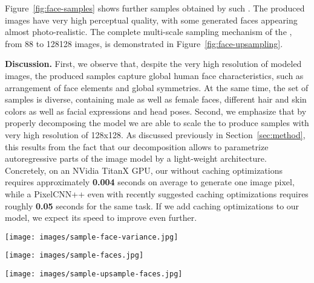 Figure~\ref{fig:face-samples} shows further samples obtained by such 
\emph{\SAMPLING}. 
The produced images have very high perceptual quality, with some generated 
faces appearing almost photo-realistic.
The complete multi-scale sampling mechanism of the \PYRAMID, from 
88 to 128128 images, is demonstrated in Figure~\ref{fig:face-upsampling}. 

\textbf{Discussion.} First, we observe that, despite the very high 
resolution of modeled images, the produced samples capture global human 
face characteristics, such as arrangement of face elements and global 
symmetries. At the same time, the set of samples is diverse, containing 
male as well as female faces, different hair and skin colors as well 
as facial expressions and head poses. 
Second, we emphasize that by properly decomposing the model we are 
able to scale the \PYRAMID to produce samples with very high 
resolution of 128x128.
As discussed previously in Section~\ref{sec:method}, this results from 
the fact that our decomposition allows to parametrize autoregressive 
parts of the image model by a light-weight architecture.
Concretely, on an NVidia TitanX GPU, our \PYRAMID without 
caching optimizations requires approximately \textbf{0.004} seconds 
on average to generate one image pixel, while a PixelCNN++ even with 
recently suggested caching optimizations requires roughly \textbf{0.05} 
seconds for the same task.
If we add caching optimizations to our model, we expect its speed to
improve even further.

\begin{figure*}
    \center
	\texttt{[image: images/sample-face-variance.jpg]}
	\caption{Effect of the variance reduction. Numbers on top of each column indicates the amount of reduction
             in the predicted log-variance of the mixture components. The last column corresponds to \SAMPLING.}
    \label{fig:face-variance}
\end{figure*}

\begin{figure*}
    \center
	\texttt{[image: images/sample-faces.jpg]}
	\caption{Images sampled from the \PYRAMID by \SAMPLING. The generated faces are of very high quality,
    many being close to photorealistic. At the same time, the set of sample is diverse in terms of the depicted 
    gender, skin color and head pose.}
    \label{fig:face-samples}
\end{figure*}

\begin{figure*}
    \center
	\texttt{[image: images/sample-upsample-faces.jpg]}
	\caption{Visualization of the \PYRAMID sampling process. Faces are first generated on a small, 8x8, resolution
             and then are gradually upsampled until reaching the desired 128x128 resolution.}
    \label{fig:face-upsampling}
\end{figure*}
